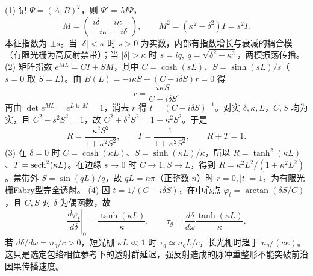 (1) 记 \(\Psi=(A,B)^T\)，则 \(\Psi'=M\Psi\)，
\[
M=\begin{pmatrix}i\delta&i\kappa\\-i\kappa&-i\delta\end{pmatrix},
\qquad M^2=(\kappa^2-\delta^2)I=s^2I.
\]
本征指数为 \(\pm s\)。当 \(|\delta|<\kappa\) 时 \(s>0\) 为实数，内部有指数增长与衰减的耦合模（有限光栅为高反射禁带）；当 \(|\delta|>\kappa\) 时 \(s=iq,\ q=\sqrt{\delta^2-\kappa^2}\)，两模振荡传播。
(2) 矩阵指数 \(e^{ML}=CI+SM\)，其中 \(C=\cosh(sL)\)、\(S=\sinh(sL)/s\)（\(s=0\) 取 \(S=L\)）。由 \(B(L)=-i\kappa S+(C-i\delta S)r=0\) 得
\[
r=\frac{i\kappa S}{C-i\delta S}.
\]
再由 \(\det e^{ML}=e^{L\operatorname{tr}M}=1\)，消去 \(r\) 得 \(t=(C-i\delta S)^{-1}\)。对实 \(\delta,\kappa,L\)，\(C,S\) 均为实，且 \(C^2-s^2S^2=1\)，故 \(C^2+\delta^2S^2=1+\kappa^2S^2\)。于是
\[
R=\frac{\kappa^2S^2}{1+\kappa^2S^2},\qquad T=\frac1{1+\kappa^2S^2},\qquad R+T=1.
\]
(3) 在 \(\delta=0\) 时 \(C=\cosh(\kappa L)\)、\(S=\sinh(\kappa L)/\kappa\)，所以 \(R=\tanh^2(\kappa L)\)、\(T={\rm sech}^2(\kappa L)\)。在边缘 \(s\to0\) 时 \(C\to1,S\to L\)，得到 \(R=\kappa^2L^2/(1+\kappa^2L^2)\)。禁带外 \(S=\sin(qL)/q\)，故 \(qL=n\pi\)（正整数 \(n\)）时 \(r=0,|t|=1\)，为有限光栅Fabry型完全透射。
(4) 因 \(t=1/(C-i\delta S)\)，在中心点 \(\varphi_t=\arctan(\delta S/C)\)，且 \(C,S\) 对 \(\delta\) 为偶函数，故
\[
\left.\frac{d\varphi_t}{d\delta}\right|_0=\frac{\tanh(\kappa L)}{\kappa},\qquad
\tau_g=\frac{d\delta}{d\omega}\frac{\tanh(\kappa L)}{\kappa}.
\]
若 \(d\delta/d\omega=n_g/c>0\)，短光栅 \(\kappa L\ll1\) 时 \(\tau_g\simeq n_gL/c\)，长光栅时趋于 \(n_g/(c\kappa)\)。这只是选定包络相位参考下的透射群延迟，强反射造成的脉冲重整形不能突破前沿因果传播速度。
